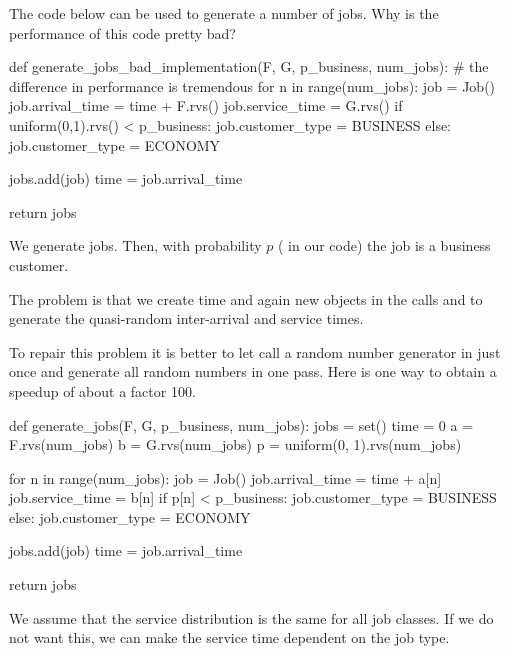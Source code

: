 \begin{exercise}
The code below can be used to generate a number of jobs. Why is the performance of this code pretty bad? 
\begin{pynotangle}
def generate_jobs_bad_implementation(F, G, p_business, num_jobs):
    # the difference in performance is tremendous
    for n in range(num_jobs):
        job = Job()
        job.arrival_time = time + F.rvs()
        job.service_time = G.rvs()
        if uniform(0,1).rvs() < p_business:
            job.customer_type = BUSINESS
        else:
            job.customer_type = ECONOMY

        jobs.add(job)
        time = job.arrival_time

    return jobs
\end{pynotangle}
We generate  jobs. Then, with probability $p$ ( in our code) the job is a business customer.
\begin{solution}
  The problem is that we create time and again new objects in the calls  and  to generate the quasi-random inter-arrival and service times.
\end{solution}
\end{exercise}


To repair this problem it is better to let  call a random number generator in  just once and generate all random numbers in one pass.
Here is one way to obtain a speedup of about a factor 100.
\begin{pynotangle}
def generate_jobs(F, G, p_business, num_jobs):
    jobs = set()
    time = 0
    a = F.rvs(num_jobs)
    b = G.rvs(num_jobs)
    p = uniform(0, 1).rvs(num_jobs)

    for n in range(num_jobs):
        job = Job()
        job.arrival_time = time + a[n]
        job.service_time = b[n]
        if p[n] <  p_business:
            job.customer_type = BUSINESS
        else:
            job.customer_type = ECONOMY

        jobs.add(job)
        time = job.arrival_time

    return jobs
\end{pynotangle}

We assume that the service distribution is the same for all job classes. If we do not want this, we can make the service time dependent on the job type.

